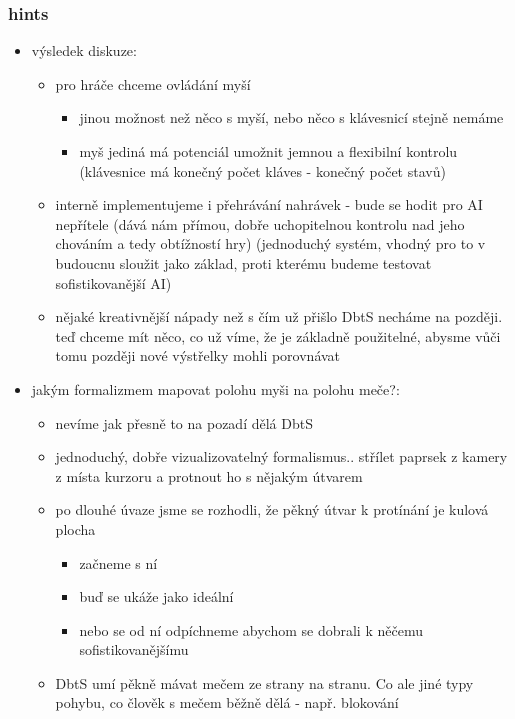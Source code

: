 \subsubsection*{hints}
\begin{itemize}
    \item výsledek diskuze:
        \begin{itemize}
            \item pro hráče chceme ovládání myší
            \begin{itemize}
                \item jinou možnost než něco s myší, nebo něco s klávesnicí stejně nemáme
                \item myš jediná má potenciál umožnit jemnou a flexibilní kontrolu (klávesnice má konečný počet kláves - konečný počet stavů)
            \end{itemize}
            \item interně implementujeme i přehrávání nahrávek - bude se hodit pro AI nepřítele (dává nám přímou, dobře uchopitelnou kontrolu nad jeho chováním a tedy obtížností hry) (jednoduchý systém, vhodný pro to v budoucnu sloužit jako základ, proti kterému budeme testovat sofistikovanější AI)
            \item nějaké kreativnější nápady než s čím už přišlo DbtS necháme na později. teď chceme mít něco, co už víme, že je základně použitelné, abysme vůči tomu později nové výstřelky mohli porovnávat
        \end{itemize}
    \item jakým formalizmem mapovat polohu myši na polohu meče?:
        \begin{itemize}
            \item nevíme jak přesně to na pozadí dělá DbtS
            \item jednoduchý, dobře vizualizovatelný formalismus.. střílet paprsek z kamery z místa kurzoru a protnout ho s nějakým útvarem 
            \item po dlouhé úvaze jsme se rozhodli, že pěkný útvar k protínání je kulová plocha
                \begin{itemize}
                    \item začneme s ní
                    \item buď se ukáže jako ideální
                    \item nebo se od ní odpíchneme abychom se dobrali k něčemu sofistikovanějšímu
                \end{itemize}
            \item DbtS umí pěkně mávat mečem ze strany na stranu. Co ale jiné typy pohybu, co člověk s mečem běžně dělá - např. blokování

\end{itemize}
\end{itemize}
